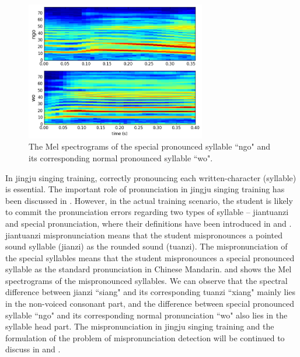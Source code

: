 \begin{figure}[ht!]
	\centering
    \includegraphics[width=0.7\textwidth]{figs/spectro_vis/ch3_special_mispronunciation.png}
    \caption{The Mel spectrograms of the special pronounced syllable ``ngo" and its corresponding normal pronounced syllable ``wo".}
        \label{fig:ch3:special_mispronunciation_example}
\end{figure}

In jingju singing training, correctly pronouncing each written-character (syllable) is essential. The important role of pronunciation in jingju singing training has been discussed in . However, in the actual training scenario, the student is likely to commit the pronunciation errors regarding two types of syllable -- \gls{jiantuanzi} and special pronunciation, where their definitions have been introduced in  and . \Gls{jiantuanzi} mispronunciation means that the student mispronounces a pointed sound syllable (\gls{jianzi}) as the rounded sound (\gls{tuanzi}). The mispronunciation of the special syllables means that the student mispronounces a special pronounced syllable as the standard pronunciation in Chinese Mandarin.  and  shows the Mel spectrograms of the mispronounced syllables. We can observe that the spectral difference between \gls{jianzi} ``siang" and its corresponding \gls{tuanzi} ``xiang" mainly lies in the non-voiced consonant part, and the difference between special pronounced syllable ``ngo" and its corresponding normal pronunciation ``wo" also lies in the syllable head part. The mispronunciation in jingju singing training and the formulation of the problem of mispronunciation detection will be continued to discuss in  and .



